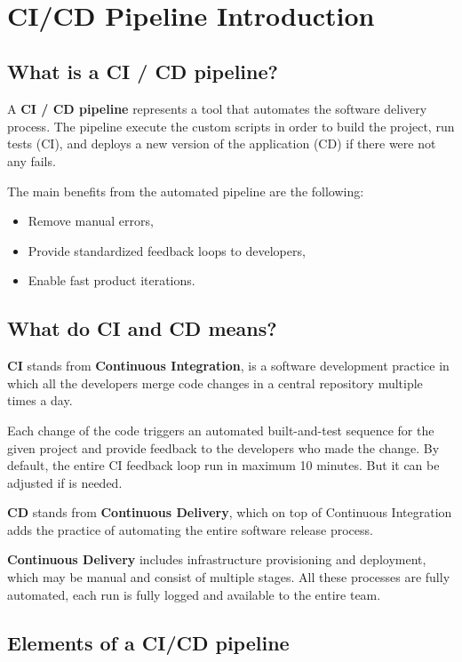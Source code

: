 \documentclass[12pt,a4paper,twoside]{article}
\begin{document}
~\newpage


\section{CI/CD Pipeline Introduction}


\subsection{What is a CI / CD pipeline?}


A \textbf{CI / CD pipeline} represents a tool that automates the software delivery process. The pipeline execute the custom scripts in order to build the project, run tests (CI), and deploys a new version of the application (CD) if there were not any fails.

The main benefits from the automated pipeline are the following:


\begin{itemize}
	\item Remove manual errors,
	\item Provide standardized feedback loops to developers,
	\item Enable fast product iterations.
\end{itemize}


\subsection{What do CI and CD means?}


\textbf{CI} stands from \textbf{Continuous Integration}, is a software development practice in which all the developers merge code changes in a central repository multiple times a day.

Each change of the code triggers an automated built-and-test sequence for the given project and provide feedback to the developers who made the change. By default, the entire CI feedback loop run in maximum 10 minutes. But it can be adjusted if is needed.


\textbf{CD} stands from \textbf{Continuous Delivery}, which on top of Continuous Integration adds the practice of automating the entire software release process.

\textbf{Continuous Delivery} includes infrastructure provisioning and deployment, which may be manual and consist of multiple stages. All these processes are fully automated, each run is fully logged and available to the entire team.


\subsection{Elements of a CI/CD pipeline}
\end{document}
